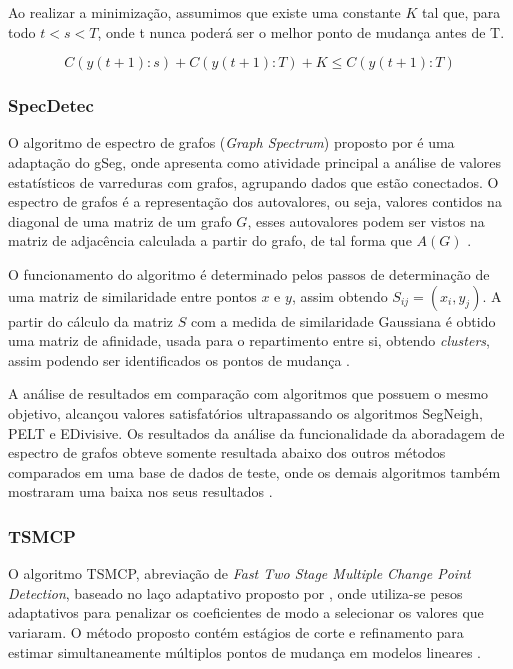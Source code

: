 Ao realizar a minimização, assumimos que existe uma constante $K$ tal que, para todo $t < s < T$, onde t nunca poderá ser o melhor ponto de mudança antes de T.

\begin{equation}
    C\left ( y\left ( t+1 \right ):s \right ) + C\left ( y\left ( t+1 \right ):T \right ) + K \leq C\left ( y\left ( t+1 \right ):T \right )
    \label{eq:calculo-pelt}
\end{equation}


\subsubsection{SpecDetec}

O algoritmo de espectro de grafos (\textit{Graph Spectrum}) proposto por \cite{Uzai2019} é uma adaptação do gSeg, onde apresenta como atividade principal a análise de valores estatísticos de varreduras com grafos, agrupando dados que estão conectados. O espectro de grafos é a representação dos autovalores, ou seja, valores contidos na diagonal de uma matriz de um grafo $G$, esses autovalores podem ser vistos na matriz de adjacência calculada a partir do grafo, de tal forma que $A(G)$ \cite{Uzai2019}.

O funcionamento do algoritmo é determinado pelos passos de determinação de uma matriz de similaridade entre pontos $x$ e $y$, assim obtendo $S_{ij} = (x_{i}, y_{j})$. A partir do cálculo da matriz $S$ com a medida de similaridade Gaussiana é obtido uma matriz de afinidade, usada para o repartimento entre si, obtendo \textit{clusters}, assim podendo ser identificados os pontos de mudança \cite{Uzai2019}.

A análise de resultados em comparação com algoritmos que possuem o mesmo objetivo, alcançou valores satisfatórios ultrapassando os algoritmos SegNeigh, PELT e EDivisive. Os resultados da análise da funcionalidade da aboradagem de espectro de grafos obteve somente resultada abaixo dos outros métodos comparados em uma base de dados de teste, onde os demais algoritmos também mostraram uma baixa nos seus resultados \cite{Uzai2019}.

\subsubsection{TSMCP}

O algoritmo TSMCP, abreviação de \textit{Fast Two Stage Multiple Change Point Detection}, baseado no laço adaptativo proposto por \cite{Zou2006}, onde utiliza-se pesos adaptativos para penalizar os coeficientes de modo a selecionar os valores que variaram. O método proposto contém estágios de corte e refinamento para estimar simultaneamente múltiplos pontos de mudança em modelos lineares \cite{Jin2016}.


